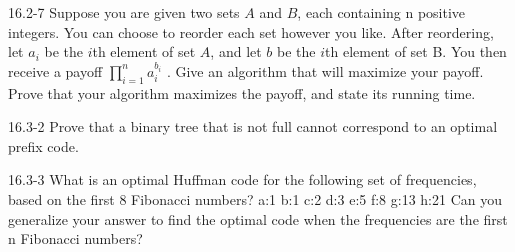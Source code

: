 \begin{problem}{16.2-7}
  Suppose you are given two sets $A$ and $B$, each containing n positive integers. You can choose to reorder each set
however you like. After reordering, let $a_i$ be the $i$th element of set $A$, and let $b$ be the $i$th element of set
B. You then receive a payoff $\displaystyle\prod\limits_{i = 1}^n a_i^{b_i}$ . Give an algorithm that will maximize your
   payoff. Prove that your algorithm maximizes the payoff, and state its running time.
\end{problem}

\begin{problem}{16.3-2}
  Prove that a binary tree that is not full cannot correspond to an optimal prefix code.
\end{problem}

\begin{problem}{16.3-3}
  What is an optimal Huffman code for the following set of frequencies, based on the first 8 Fibonacci numbers?
  \br
  a:1 b:1 c:2 d:3 e:5 f:8 g:13 h:21
  \br
  Can you generalize your answer to find the optimal code when the frequencies are the first n Fibonacci numbers?
\end{problem}



